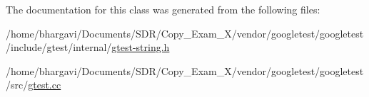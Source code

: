 The documentation for this class was generated from the following files\+:\begin{DoxyCompactItemize}
\item 
/home/bhargavi/\+Documents/\+S\+D\+R/\+Copy\+\_\+\+Exam\+\_\+X/vendor/googletest/googletest/include/gtest/internal/\hyperlink{gtest-string_8h}{gtest-\/string.\+h}\item 
/home/bhargavi/\+Documents/\+S\+D\+R/\+Copy\+\_\+\+Exam\+\_\+X/vendor/googletest/googletest/src/\hyperlink{gtest_8cc}{gtest.\+cc}\end{DoxyCompactItemize}
